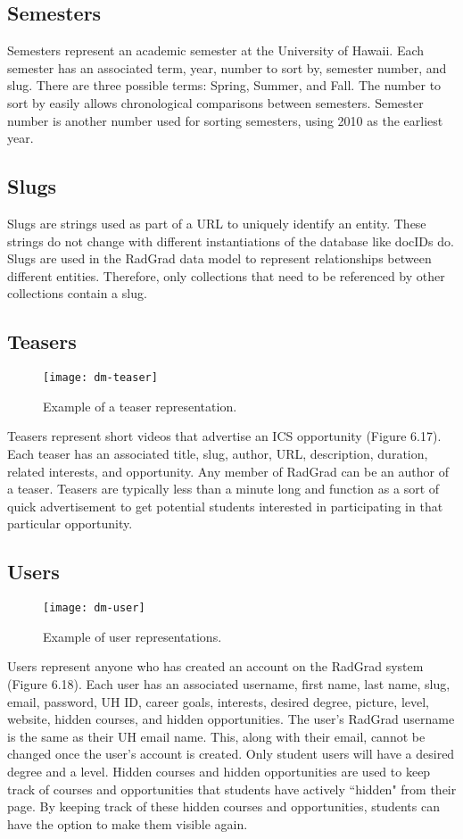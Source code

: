 \subsection{Semesters}
Semesters represent an academic semester at the University of Hawaii. Each semester has an associated term, year, number to sort by, semester number, and slug. There are three possible terms: Spring, Summer, and Fall. The number to sort by easily allows chronological comparisons between semesters. Semester number is another number used for sorting semesters, using 2010 as the earliest year. 

\subsection{Slugs}
Slugs are strings used as part of a URL to uniquely identify an entity. These strings do not change with different instantiations of the database like docIDs do. Slugs are used in the RadGrad data model to represent relationships between different entities. Therefore, only collections that need to be referenced by other collections contain a slug. 

\subsection{Teasers}
\begin{figure}[htbp!]
\centering
\texttt{[image: dm-teaser]}
\caption{Example of a teaser representation.}
\end{figure}
Teasers represent short videos that advertise an ICS opportunity (Figure 6.17). Each teaser has an associated title, slug, author, URL, description, duration, related interests, and opportunity. Any member of RadGrad can be an author of a teaser. Teasers are typically less than a minute long and function as a sort of quick advertisement to get potential students interested in participating in that particular opportunity. 

\subsection{Users}
\begin{figure}[htbp!]
\centering
\texttt{[image: dm-user]}
\caption{Example of user representations.}
\end{figure}
Users represent anyone who has created an account on the RadGrad system (Figure 6.18). Each user has an associated username, first name, last name, slug, email, password, UH ID, career goals, interests, desired degree, picture, level, website, hidden courses, and hidden opportunities. The user's RadGrad username is the same as their UH email name. This, along with their email, cannot be changed once the user's account is created. Only student users will have a desired degree and a level. Hidden courses and hidden opportunities are used to keep track of courses and opportunities that students have actively ``hidden" from their page. By keeping track of these hidden courses and opportunities, students can have the option to make them visible again.

